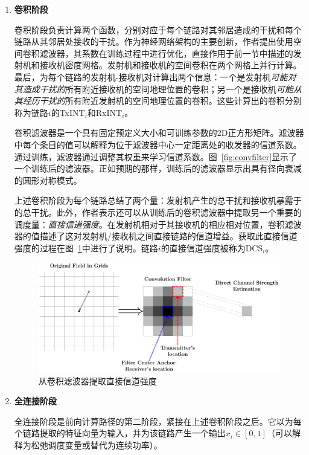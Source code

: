 \documentclass[UTF8, 12pt]{article}
\numberwithin{figure}{section}
\begin{document}
\begin{enumerate}

  \item \textbf{卷积阶段}
  
  卷积阶段负责计算两个函数，分别对应于每个链路对其邻居造成的干扰和每个链路从其邻居处接收的干扰。作为神经网络架构的主要创新，作者提出使用空间卷积滤波器，其系数在训练过程中进行优化，直接作用于前一节中描述的发射机和接收机密度网格。发射机和接收机的空间卷积在两个网格上并行计算。最后，为每个链路的发射机-接收机对计算出两个信息：一个是发射机\emph{可能对其造成干扰的}所有附近接收机的空间地理位置的卷积；另一个是接收机\emph{可能从其经历干扰的}所有附近发射机的空间地理位置的卷积。这些计算出的卷积分别称为链路$i$的TxINT$_i$和RxINT$_i$。
  
  卷积滤波器是一个具有固定预定义大小和可训练参数的2D正方形矩阵。滤波器中每个条目的值可以解释为位于滤波器中心一定距离处的收发器的信道系数。通过训练，滤波器通过调整其权重来学习信道系数。图~\ref{fig:convfilter}显示了一个训练后的滤波器。正如预期的那样，训练后的滤波器显示出具有径向衰减的圆形对称模式。
  
  上述卷积阶段为每个链路总结了两个量：发射机产生的总干扰和接收机暴露于的总干扰。此外，作者表示还可以从训练后的卷积滤波器中提取另一个重要的调度量：\emph{直接信道强度}。在发射机相对于其接收机的相应相对位置，卷积滤波器的值描述了这对发射机/接收机之间直接链路的信道增益。获取此直接信道强度的过程在图~\ref{fig:directchannelstrength}中进行了说明。链路$i$的直接信道强度被称为DCS$_i$。
  
  \begin{figure}
  \centering
  \includegraphics[width=12cm]{fig/DirectChannelStrength}
  \caption{从卷积滤波器提取直接信道强度}
  \label{fig:directchannelstrength}
  \end{figure}
  
  \item \textbf{全连接阶段}
  
  全连接阶段是前向计算路径的第二阶段，紧接在上述卷积阶段之后。它以为每个链路提取的特征向量为输入，并为该链路产生一个输出$x_i \in [0,1]$（可以解释为松弛调度变量或替代为连续功率）。


\end{enumerate}
\end{document}
